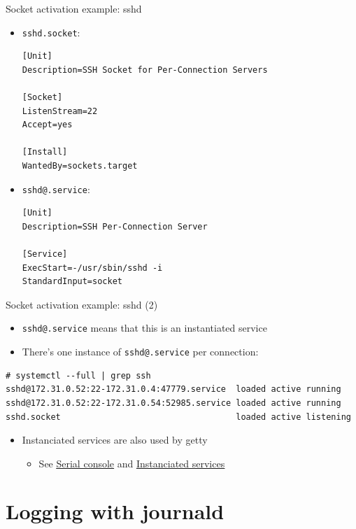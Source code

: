 \documentclass[11pt,final,usepdftitle=false]{beamer}
\begin{document}
\begin{frame}[fragile]{Socket activation example: sshd}
\begin{itemize}
\item \texttt{sshd.socket}:
\begin{lstlisting}[basicstyle=\ttfamily\footnotesize,escapeinside={||}]
[Unit]
Description=SSH Socket for Per-Connection Servers

[Socket]
ListenStream=22
Accept=yes

[Install]
WantedBy=sockets.target
\end{lstlisting}
\item \texttt{sshd@.service}:
\begin{lstlisting}[basicstyle=\ttfamily\footnotesize,escapeinside={||}]
[Unit]
Description=SSH Per-Connection Server

[Service]
ExecStart=-/usr/sbin/sshd -i
StandardInput=socket
\end{lstlisting}
\end{itemize}
\end{frame}

\begin{frame}[fragile]{Socket activation example: sshd (2)}
\begin{itemize}
	\item \texttt{sshd@.service} means that this is an \alert{instantiated service}
	\hbr
\item There's one instance of \texttt{sshd@.service} per connection:
\end{itemize}
\begin{lstlisting}[basicstyle=\ttfamily\scriptsize]
# systemctl --full | grep ssh
sshd@172.31.0.52:22-172.31.0.4:47779.service  loaded active running
sshd@172.31.0.52:22-172.31.0.54:52985.service loaded active running
sshd.socket                                   loaded active listening
\end{lstlisting}
\begin{itemize}
\item Instanciated services are also used by getty
	\begin{itemize}
		\item See \href{http://0pointer.de/blog/projects/serial-console.html}{\ul{Serial console}}
	and \href{http://0pointer.de/blog/projects/instances.html}{\ul{Instanciated services}}
	\end{itemize}
\end{itemize}
\end{frame}

\section{Logging with journald}
\end{document}
